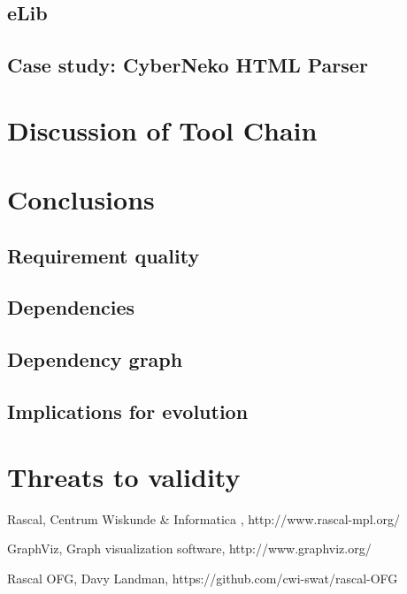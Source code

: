 \documentclass[a4paper,11pt]{article}
\begin{document}
		\subsection{eLib}
			
			
		\subsection{Case study: CyberNeko HTML Parser}
			
	
	\section{Discussion of Tool Chain}
	
	
	\section{Conclusions}
		
		\subsection{Requirement quality}
			

		\subsection{Dependencies}
			

		\subsection{Dependency graph}
		

		\subsection{Implications for evolution}


	\section{Threats to validity}


	\begin{thebibliography}{9}
			Rascal, Centrum Wiskunde \& Informatica , http://www.rascal-mpl.org/

			GraphViz, Graph visualization software, http://www.graphviz.org/
			
			Rascal OFG, Davy Landman, https://github.com/cwi-swat/rascal-OFG

	\end{thebibliography}
\end{document}
